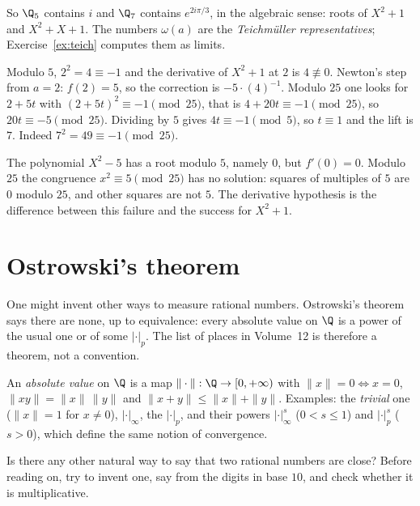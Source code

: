 So $\Q_5$ contains $i$ and $\Q_7$ contains $e^{2i\pi/3}$, in the algebraic sense: roots of $X^2+1$ and $X^2+X+1$. The numbers $\omega(a)$ are the \emph{Teichm\"uller representatives}; Exercise~\ref{ex:teich} computes them as limits.

\begin{examplex}
Modulo $5$, $2^2=4\equiv -1$ and the derivative of $X^2+1$ at $2$ is $4\not\equiv 0$. Newton's step from $a=2$: $f(2)=5$, so the correction is $-5\cdot(4)^{-1}$. Modulo $25$ one looks for $2+5t$ with $(2+5t)^2\equiv -1\pmod{25}$, that is $4+20t\equiv -1\pmod{25}$, so $20t\equiv -5\pmod{25}$. Dividing by $5$ gives $4t\equiv -1\pmod 5$, so $t\equiv 1$ and the lift is $7$. Indeed $7^2=49\equiv -1\pmod{25}$.
\end{examplex}

\begin{examplex}
The polynomial $X^2-5$ has a root modulo $5$, namely $0$, but $f'(0)=0$. Modulo $25$ the congruence $x^2\equiv 5\pmod{25}$ has no solution: squares of multiples of $5$ are $0$ modulo $25$, and other squares are not $5$. The derivative hypothesis is the difference between this failure and the success for $X^2+1$.
\end{examplex}

\section{Ostrowski's theorem}

One might invent other ways to measure rational numbers. Ostrowski's theorem says there are none, up to equivalence: every absolute value on $\Q$ is a power of the usual one or of some $|\cdot|_p$. The list of places in Volume~12 is therefore a theorem, not a convention.

An \emph{absolute value} on $\Q$ is a map $\|\cdot\|:\Q\to[0,+\infty)$ with $\|x\|=0\iff x=0$, $\|xy\|=\|x\|\,\|y\|$ and $\|x+y\|\le\|x\|+\|y\|$. Examples: the \emph{trivial} one ($\|x\|=1$ for $x\ne0$), $|\cdot|_\infty$, the $|\cdot|_p$, and their powers $|\cdot|_\infty^s$ ($0<s\le1$) and $|\cdot|_p^s$ ($s>0$), which define the same notion of convergence.

\begin{think}
Is there any other natural way to say that two rational numbers are close? Before reading on, try to invent one, say from the digits in base $10$, and check whether it is multiplicative.
\end{think}


